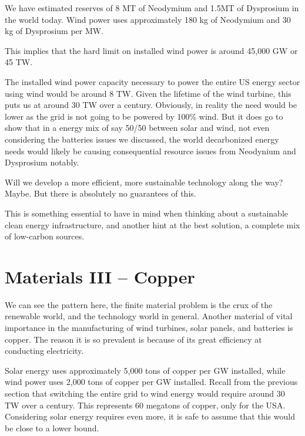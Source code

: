 We have estimated reserves of 8 MT of Neodymium and 1.5MT of Dysprosium in the world today. Wind power uses approximately 180 kg of Neodymium and 30 kg of Dysprosium per MW.

This implies that the hard limit on installed wind power is around 45,000 GW or 45 TW.

The installed wind power capacity necessary to power the entire US energy sector using wind would be around 8 TW. Given the lifetime of the wind turbine, this puts us at around 30 TW over a century. Obviously, in reality the need would be lower as the grid is not going to be powered by 100\% wind. But it does go to show that in a energy mix of say 50/50 between solar and wind, not even considering the batteries issues we discussed, the world decarbonized energy needs would likely be causing consequential resource issues from Neodynium and Dysprosium notably.

Will we develop a more efficient, more sustainable technology along the way? Maybe. But there is absolutely no guarantees of this.

This is something essential to have in mind when thinking about a sustainable clean energy infrastructure, and another hint at the best solution, a complete mix of low-carbon sources.

\section{Materials III -- Copper}

We can see the pattern here, the finite material problem is the crux of the renewable world, and the technology world in general. Another material of vital importance in the manufacturing of wind turbines, solar panels, and batteries is copper. The reason it is so prevalent is because of its great efficiency at conducting electricity.

Solar energy uses approximately 5,000 tons of copper per GW installed, while wind power uses 2,000 tons of copper per GW installed. Recall from the previous section that switching the entire grid to wind energy would require around 30 TW over a century. This represents 60 megatons of copper, only for the USA. Considering solar energy requires even more, it is safe to assume that this would be close to a lower bound.

